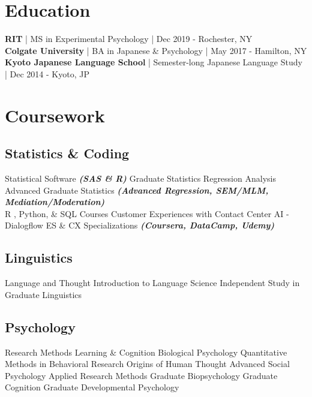 \documentclass[letterpaper]{deedy-resume_sm} %
\begin{document}
\section{Education} 
\textbf{RIT} | MS in Experimental Psychology | Dec 2019 - Rochester, NY\\
\sectionspace %
\textbf{Colgate University} | BA in Japanese \& Psychology | May 2017 - Hamilton, NY\\
\sectionspace %
\textbf{Kyoto Japanese Language School} | Semester-long Japanese Language Study | Dec 2014 - Kyoto, JP\\
\sectionspace %

\section{Coursework}
\subsection{Statistics \& Coding}
Statistical Software \textbullet{} 
{\footnotesize \textit{\textbf{(SAS \& R) }}} \textbullet{} 
Graduate Statistics \textbullet{} 
Regression Analysis \textbullet{} 
Advanced Graduate Statistics \textbullet{} 
{\footnotesize \textit{\textbf{(Advanced Regression, SEM/MLM, Mediation/Moderation)}}}
\\
R , Python, \& SQL Courses \textbullet{} 
Customer Experiences with Contact Center AI - Dialogflow ES \& CX Specializations {\footnotesize \textit{\textbf{(Coursera, DataCamp, Udemy)}}}
\sectionspace
\subsection{Linguistics}
Language and Thought \textbullet{} 
Introduction to Language Science \textbullet{} 
Independent Study in Graduate Linguistics \textbullet{} 
\sectionspace
\subsection{Psychology}
Research Methods \textbullet{} 
Learning \& Cognition \textbullet{} 
Biological Psychology \textbullet{} 
Quantitative Methods in Behavioral Research \textbullet{} 
Origins of Human Thought \textbullet{} 
Advanced Social Psychology \textbullet{} 
Applied Research Methods \textbullet{} 
Graduate Biopsychology \textbullet{} 
Graduate Cognition \textbullet{} 
Graduate Developmental Psychology \textbullet{} 
\sectionspace %
\end{document}
